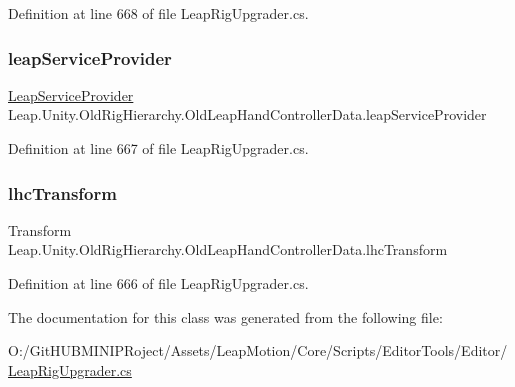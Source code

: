 Definition at line 668 of file Leap\+Rig\+Upgrader.\+cs.

\mbox{\label{class_leap_1_1_unity_1_1_old_rig_hierarchy_1_1_old_leap_hand_controller_data_a06731cc5d6edecb981eff99f75a71185}} 
\subsubsection{\texorpdfstring{leapServiceProvider}{leapServiceProvider}}
{\footnotesize\ttfamily \mbox{\hyperlink{class_leap_1_1_unity_1_1_leap_service_provider}{Leap\+Service\+Provider}} Leap.\+Unity.\+Old\+Rig\+Hierarchy.\+Old\+Leap\+Hand\+Controller\+Data.\+leap\+Service\+Provider}



Definition at line 667 of file Leap\+Rig\+Upgrader.\+cs.

\mbox{\label{class_leap_1_1_unity_1_1_old_rig_hierarchy_1_1_old_leap_hand_controller_data_a30da5c72960cdc56b84358995a98cfb4}} 
\subsubsection{\texorpdfstring{lhcTransform}{lhcTransform}}
{\footnotesize\ttfamily Transform Leap.\+Unity.\+Old\+Rig\+Hierarchy.\+Old\+Leap\+Hand\+Controller\+Data.\+lhc\+Transform}



Definition at line 666 of file Leap\+Rig\+Upgrader.\+cs.



The documentation for this class was generated from the following file\+:\begin{DoxyCompactItemize}
\item 
O\+:/\+Git\+H\+U\+B\+M\+I\+N\+I\+P\+Roject/\+Assets/\+Leap\+Motion/\+Core/\+Scripts/\+Editor\+Tools/\+Editor/\mbox{\hyperlink{_leap_rig_upgrader_8cs}{Leap\+Rig\+Upgrader.\+cs}}\end{DoxyCompactItemize}
